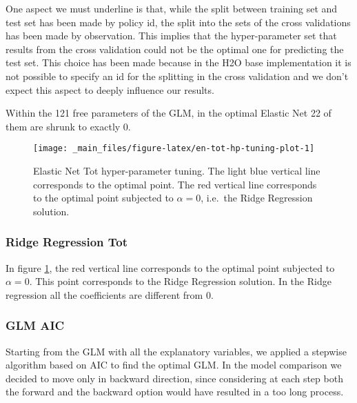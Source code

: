 \documentclass[a4paper, twoside, openright, 12pt]{report}
\theoremstyle{definition}
\theoremstyle{definition}
\theoremstyle{definition}
\theoremstyle{remark}
\begin{document}
One aspect we must underline is that, while the split between training set and test set has been made by policy id, the split into the sets of the cross validations has been made by observation. This implies that the hyper-parameter set that results from the cross validation could not be the optimal one for predicting the test set. This choice has been made because in the H2O base implementation it is not possible to specify an id for the splitting in the cross validation and we don't expect this aspect to deeply influence our results.

Within the 121 free parameters of the GLM, in the optimal Elastic Net 22 of them are shrunk to exactly 0.





\begin{figure}[!hbtp]

{\centering \texttt{[image: \_main\_files/figure-latex/en-tot-hp-tuning-plot-1]} 

}

\caption[Elastic Net Tot hyper-parameter tuning.]{Elastic Net Tot hyper-parameter tuning. The light blue vertical line corresponds to the optimal point. The red vertical line corresponds to the optimal point subjected to \(\alpha=0\), i.e.~the Ridge Regression solution.}\label{fig:en-tot-hp-tuning-plot}
\end{figure}

\hypertarget{ridge-regression-tot}{%
\subsubsection{Ridge Regression Tot}\label{ridge-regression-tot}}

In figure \ref{fig:en-tot-hp-tuning-plot}, the red vertical line corresponds to the optimal point subjected to \(\alpha=0\). This point corresponds to the Ridge Regression solution. In the Ridge regression all the coefficients are different from 0.

\hypertarget{glm-aic}{%
\subsubsection{GLM AIC}\label{glm-aic}}

Starting from the GLM with all the explanatory variables, we applied a stepwise algorithm based on AIC to find the optimal GLM. In the model comparison we decided to move only in backward direction, since considering at each step both the forward and the backward option would have resulted in a too long process.
\end{document}

